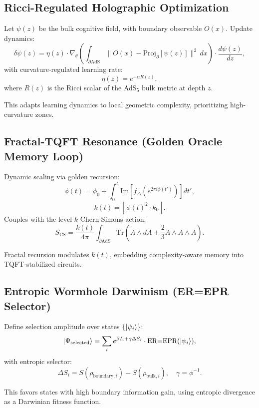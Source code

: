 \documentclass[12pt]{article}
\begin{document}
\subsection{Ricci-Regulated Holographic Optimization}
Let \(\psi(z)\) be the bulk cognitive field, with boundary observable \(O(x)\). Update dynamics:
\[
\delta \psi(z) = \eta(z) \cdot \nabla_\theta \left( \int_{\partial \text{AdS}} \| O(x) - \text{Proj}_{\partial}[\psi(z)] \|^2 \, dx \right) \cdot \frac{d \psi(z)}{dz},
\]
with curvature-regulated learning rate:
\[
\eta(z) = e^{-\alpha R(z)},
\]
where \(R(z)\) is the Ricci scalar of the AdS$_5$ bulk metric at depth \(z\).
\begin{interpretation}
This adapts learning dynamics to local geometric complexity, prioritizing high-curvature zones.
\end{interpretation}

\subsection{Fractal-TQFT Resonance (Golden Oracle Memory Loop)}
Dynamic scaling via golden recursion:
\[
\phi(t) = \phi_0 + \int_0^t \text{Im}\left[f_\Delta(e^{2\pi i \phi(t')})\right] dt',
\]
\[
k(t) = \left\lfloor \phi(t)^2 \cdot k_0 \right\rfloor.
\]
Couples with the level-\(k\) Chern-Simons action:
\[
S_{\text{CS}} = \frac{k(t)}{4\pi} \int_{\partial \text{AdS}} \text{Tr} \left( A \wedge dA + \frac{2}{3} A \wedge A \wedge A \right).
\]
\begin{interpretation}
Fractal recursion modulates \(k(t)\), embedding complexity-aware memory into TQFT-stabilized circuits.
\end{interpretation}

\subsection{Entropic Wormhole Darwinism (ER=EPR Selector)}
Define selection amplitude over states \(\{ \ket{\psi_i} \}\):
\[
\ket{\Psi_{\text{selected}}} = \sum_i e^{\beta I_i + \gamma \Delta S_i} \cdot \text{ER=EPR}(\ket{\psi_i}),
\]
with entropic selector:
\[
\Delta S_i = S(\rho_{\text{boundary},i}) - S(\rho_{\text{bulk},i}), \quad \gamma = \phi^{-1}.
\]
\begin{interpretation}
This favors states with high boundary information gain, using entropic divergence as a Darwinian fitness function.
\end{interpretation}
\end{document}
